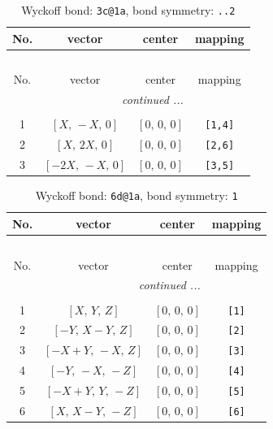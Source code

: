 \documentclass[fleqn,8pt]{jsarticle}
\begin{document}
\renewcommand{\arraystretch}{1.2}
\begin{longtable}{cccc}
\caption{Wyckoff bond: {\tt 3c@1a}, bond symmetry: {\tt ..2}}
 \\
 \hline \hline
No. & vector & center & mapping \\ \hline \endfirsthead

\multicolumn{3}{l}{\tablename\ \thetable{}} \\
 \hline \hline
No. & vector & center & mapping \\ \hline \endhead

 \hline \hline
\multicolumn{3}{r}{\footnotesize\it continued ...} \\ \endfoot

 \hline \hline
\multicolumn{3}{r}{} \\ \endlastfoot

1 & $\left[ X,\, - X,\, 0 \right]$ & $\left[ 0,\, 0,\, 0 \right]$ & {\tt [1,4]} \\ \hline
2 & $\left[ X,\, 2 X,\, 0 \right]$ & $\left[ 0,\, 0,\, 0 \right]$ & {\tt [2,6]} \\ \hline
3 & $\left[ - 2 X,\, - X,\, 0 \right]$ & $\left[ 0,\, 0,\, 0 \right]$ & {\tt [3,5]} \\
\end{longtable}
\renewcommand{\arraystretch}{1.2}
\begin{longtable}{cccc}
\caption{Wyckoff bond: {\tt 6d@1a}, bond symmetry: {\tt 1}}
 \\
 \hline \hline
No. & vector & center & mapping \\ \hline \endfirsthead

\multicolumn{3}{l}{\tablename\ \thetable{}} \\
 \hline \hline
No. & vector & center & mapping \\ \hline \endhead

 \hline \hline
\multicolumn{3}{r}{\footnotesize\it continued ...} \\ \endfoot

 \hline \hline
\multicolumn{3}{r}{} \\ \endlastfoot

1 & $\left[ X,\, Y,\, Z \right]$ & $\left[ 0,\, 0,\, 0 \right]$ & {\tt [1]} \\ \hline
2 & $\left[ - Y,\, X - Y,\, Z \right]$ & $\left[ 0,\, 0,\, 0 \right]$ & {\tt [2]} \\ \hline
3 & $\left[ - X + Y,\, - X,\, Z \right]$ & $\left[ 0,\, 0,\, 0 \right]$ & {\tt [3]} \\ \hline
4 & $\left[ - Y,\, - X,\, - Z \right]$ & $\left[ 0,\, 0,\, 0 \right]$ & {\tt [4]} \\ \hline
5 & $\left[ - X + Y,\, Y,\, - Z \right]$ & $\left[ 0,\, 0,\, 0 \right]$ & {\tt [5]} \\ \hline
6 & $\left[ X,\, X - Y,\, - Z \right]$ & $\left[ 0,\, 0,\, 0 \right]$ & {\tt [6]} \\
\end{longtable}
\end{document}
